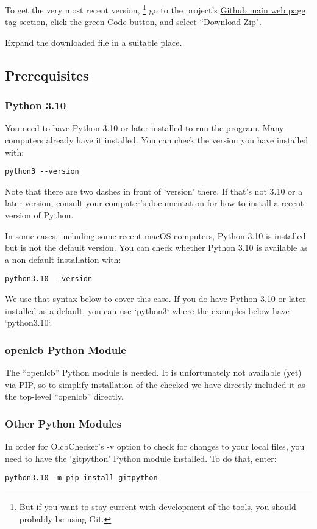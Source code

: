 To get the very most recent version,
\footnote{But if you want to stay current with development of the tools, you should probably be using Git.}
go to the project's
\href{https://github.com/bobjacobsen/OlcbChecker}{Github main web page tag section},
click the green Code button, and select ``Download Zip".

Expand the downloaded file in a suitable place.

\subsection{Prerequisites}

\subsubsection{Python 3.10}
You need to have Python 3.10 or later installed to run the program. 
Many computers already have it installed. 
You can check the version you have installed with:
\begin{verbatim}
python3 --version
\end{verbatim}
Note that there are two dashes in front of `version' there. If that's
not 3.10 or a later version, consult your
computer's documentation for how to install a recent version of Python. 

In some cases, including some recent macOS computers, Python 3.10 is installed but
is not the default version.  You can check whether Python 3.10 is available
as a non-default installation with:
\begin{verbatim}
python3.10 --version
\end{verbatim}
We use that syntax below to cover this case.  If you do have Python 3.10 or later 
installed as a default, you can use `python3` where the examples below have `python3.10`.

\subsubsection{openlcb Python Module}
The ``openlcb'' Python module is needed. It is unfortunately
not available (yet) via PIP, so to simplify installation of the 
checked we have directly included it as the top-level ``openlcb'' directly.

\subsubsection{Other Python Modules}
In order for OlcbChecker's -v option to check for changes to your local files, 
you need to have the `gitpython' Python module installed. To do that,
enter:
\begin{verbatim}
python3.10 -m pip install gitpython
\end{verbatim}

